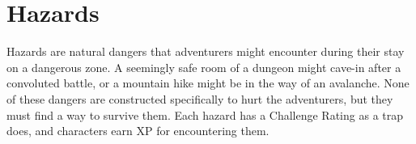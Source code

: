 \section{Hazards}
Hazards are natural dangers that adventurers might encounter during their stay on a dangerous zone. A seemingly safe room of a dungeon might cave-in after a convoluted battle, or a mountain hike might be in the way of an avalanche. None of these dangers are constructed specifically to hurt the adventurers, but they must find a way to survive them. Each hazard has a Challenge Rating as a trap does, and characters earn XP for encountering them.



